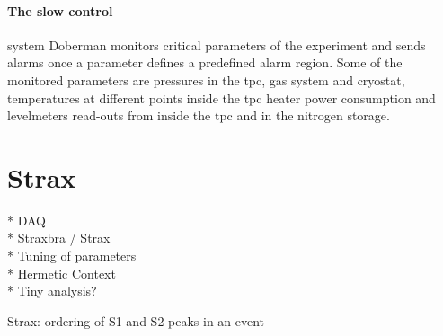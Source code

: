 \paragraph{The slow control} system Doberman \cite{} monitors critical parameters of the experiment and sends alarms once a parameter defines a predefined alarm region.
Some of the monitored parameters are pressures in the \gls{tpc}, gas system and cryostat, temperatures at different points inside the \gls{tpc} heater power consumption and levelmeters read-outs from inside the \gls{tpc} and in the nitrogen storage.



\newpage
\FloatBarrier
\section{Strax}
\label{sec:Strax}
\FloatBarrier

* DAQ \\
* Straxbra / Strax \\
* Tuning of parameters \\
* Hermetic Context \\
* Tiny analysis?



Strax: ordering of S1 and S2 peaks in an event

